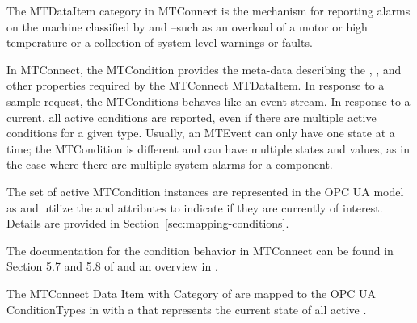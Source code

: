 The  \gls{MTDataItem} \gls{category} in MTConnect is the mechanism for reporting alarms on the machine classified by  and --such as an overload of a motor or high temperature or a collection of system level warnings or faults.

In MTConnect, the \gls{MTCondition} provides the meta-data describing the , , and other properties required by the MTConnect \gls{MTDataItem}. In response to a \gls{sample} request, the \glspl{MTCondition} behaves like an event stream. In response to a \gls{current}, all active conditions are reported, even if there are multiple active conditions for a given type. Usually, an \gls{MTEvent} can only have one state at a time; the \gls{MTCondition} is different and can have multiple states and values, as in the case where there are multiple system alarms for a component.

The set of active \gls{MTCondition} instances are represented in the OPC UA model as  and utilize the  and  attributes to indicate if they are currently of interest. Details are provided in Section~\ref{sec:mapping-conditions}.

The documentation for the condition behavior in MTConnect can be found in Section 5.7 and 5.8 of \cite{MTCPart3} and an overview in \cite{MTCPart2}.

The MTConnect Data Item with Category of  are mapped to the OPC UA \glspl{ConditionType} in \cite{UAPart9} with a  that represents the current state of all active .

